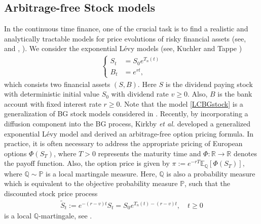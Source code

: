 \documentclass[12pt, a4paper,reqno]{amsart}
\theoremstyle{definition}
\theoremstyle{myremark}
\numberwithin{equation}{section}
\begin{document}
 \subsection{Arbitrage-free Stock models}
 In the continuous time finance, one of the crucial task is to find a realistic and analytically tractable models for price evolutions of risky financial assets (see, \cite{bgm2024} and \cite{bilateral0}, \cite{bilateral2}). We consider the exponential L\'evy models (see, K$\ddot{\text{u}}$chler and Tappe \cite{bilateral2,tsd2013})
  \begin{align}\label{LCBGstock}
 	\begin{cases}
 	S_t&=S_0e^{T_n(t)}\\
 	B_t&=e^{rt},
 	\end{cases}
 \end{align}
\noindent
which consists two financial assets $(S,B)$. Here $S$ is the dividend paying stock with deterministic initial value $S_0$ with dividend rate $v\geq 0$. Also, $B$ is the bank account with fixed interest rate $r\geq 0$.  Note that the model \eqref{LCBGstock} is a generalization of BG stock models considered in \cite{bilateral2}. Recently, by incorporating a diffusion component into the BG process, Kirkby {\it et al.} \cite{bgm2024} developed a generalized exponential L\'evy model and derived an arbitrage-free option pricing formula. In practice, it is often necessary to address the appropriate pricing of European options $\Phi(S_T)$, where $T > 0$ represents the maturity time and $\Phi : \mathbb{R} \to \mathbb{R}$ denotes the payoff function. Also, the option price is given by $\pi:=e^{-rT}\mathbb{E}_{\mathbb{Q}}[\Phi(S_T)],$ where $\mathbb{Q} \sim \mathbb{P}$ is a local martingale measure. Here, $\mathbb{Q}$ is also a probability measure which is equivalent to the objective probability measure $\mathbb{P}$, such that the discounted stock price process
\begin{align}\label{dspp}
	\tilde{S}_t := e^{-(r-v)t}S_t = S_0 e^{T_n(t) - (r-v)t}, \quad t \ge 0
\end{align}
is a local $\mathbb{Q}$-martingale, see \cite{bilateral2}. 
\end{document}
